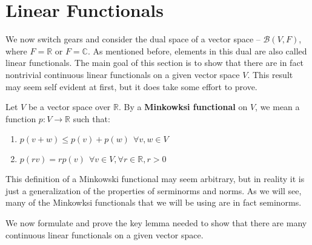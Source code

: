 \documentclass[a4paper,12pt]{report}
\newcommand{\ms}[1]{\mathscr{#1}}
\newenvironment{definition}[1][Definition.]{\begin{trivlist}
\item[\hskip \labelsep {\bfseries #1}]}{\end{trivlist}}
\begin{document}
	\section{Linear Functionals}
	
	We now switch gears and consider the dual space of a vector space -- $\ms{B}(V, F)$, where $F = \mathbb{R}$ or $F = \mathbb{C}$. As mentioned before, elements in this dual are also called linear functionals. The main goal of this section is to show that there are in fact nontrivial continuous linear functionals on a given vector space $V$. This result may seem self evident at first, but it does take some effort to prove.
	
	\begin{definition}
	Let $V$ be a vector space over $\mathbb{R}$. By a \textbf{Minkowksi functional} on $V$, we mean a function $p: V \rightarrow \mathbb{R}$ such that:
	\begin{enumerate}[label=(\alph*)]
	
		\item $p(v + w) \leq p(v) + p(w) ~~ \forall v, w \in V $
		
		\item $p(rv) = rp(v) ~~ \forall v \in V, \forall r \in \mathbb{R}, r > 0 $
	
	\end{enumerate}
	\end{definition}
	
	\noindent This definition of a Minkowski functional may seem arbitrary, but in reality it is just a generalization of the properties of serminorms and norms. As we will see, many of the Minkowksi functionals that we will be using are in fact seminorms. 
	
	We now formulate and prove the key lemma needed to show that there are many continuous linear functionals on a given vector space.
	
\end{document}
